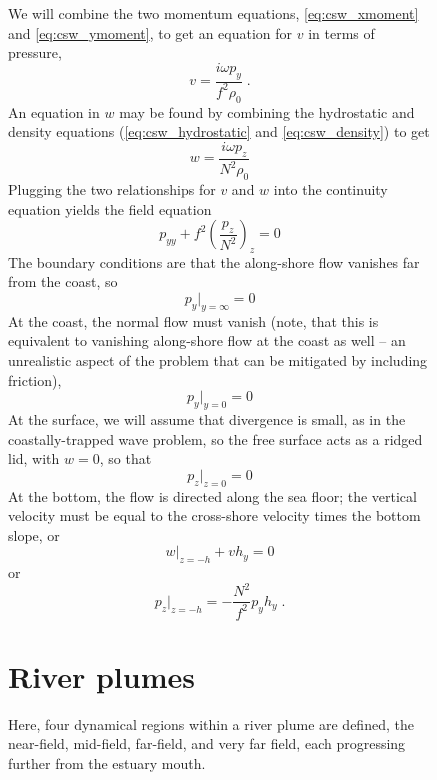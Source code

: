 \documentclass[11pt]{report}
\numberwithin{equation}{section}
\begin{document}
\begin{figure}
We will combine the two momentum equations, \ref{eq:csw_xmoment} and \ref{eq:csw_ymoment}, to get an equation for $v$ in terms of pressure,
\begin{equation}
    v = \frac{i \omega p_y}{f^2 \rho_0} \; .
\end{equation}
An equation in $w$ may be found by combining the hydrostatic and density equations (\ref{eq:csw_hydrostatic} and \ref{eq:csw_density}) to get
\begin{equation}
    w = \frac{i \omega p_z}{N^2 \rho_0}
\end{equation}
Plugging the two relationships for $v$ and $w$ into the continuity equation yields the field equation
\begin{equation}
    p_{yy} + f^2 \left( \frac{p_z}{N^2} \right)_z = 0
\end{equation}
The boundary conditions are that the along-shore flow vanishes far from the coast, so
\begin{equation}
    p_y\bigg|_{y=\infty} = 0
\end{equation}
At the coast, the normal flow must vanish (note, that this is equivalent to vanishing along-shore flow at the coast as well -- an unrealistic aspect of the problem that can be mitigated by including friction),
\begin{equation}
    p_y\bigg|_{y=0} = 0
\end{equation}
At the surface, we will assume that divergence is small, as in the coastally-trapped wave problem, so the free surface acts as a ridged lid, with $w=0$, so that
\begin{equation}
    p_z\bigg|_{z=0} = 0
\end{equation}
At the bottom, the flow is directed along the sea floor; the vertical velocity must be equal to the cross-shore velocity times the bottom slope, or
\begin{equation}
    w\bigg|_{z=-h} + v h_y = 0
\end{equation}
or
\begin{equation}
    p_z\bigg|_{z=-h} = - \frac{N^2}{f^2} p_y h_y \; .
\end{equation}




\section{River plumes}

Here, four dynamical regions within a river plume are defined, the near-field, mid-field, far-field, and very far field, each progressing further from the estuary mouth.


\end{figure}
\end{document}
